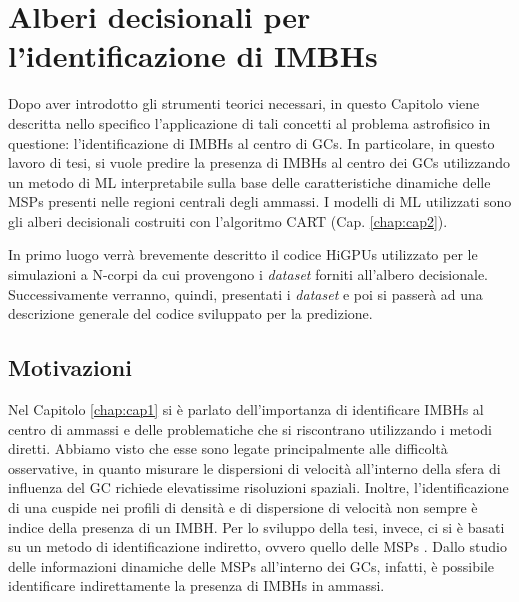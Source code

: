 \chapter{Alberi decisionali per l'identificazione di IMBHs}
\label{chap:cap3}
Dopo aver introdotto gli strumenti teorici necessari, in questo Capitolo viene descritta nello specifico l'applicazione di tali concetti al problema astrofisico in questione: l'identificazione di IMBHs al centro di GCs. In particolare, in questo lavoro di tesi, si vuole predire la presenza di IMBHs al centro dei GCs utilizzando un metodo di ML interpretabile sulla base delle caratteristiche dinamiche delle MSPs presenti nelle regioni centrali degli ammassi. I modelli di ML utilizzati sono gli alberi decisionali costruiti con l'algoritmo CART (Cap. \ref{chap:cap2}). 

In primo luogo verrà brevemente descritto il codice HiGPUs utilizzato per le simulazioni a N-corpi da cui provengono i \textit{dataset} forniti all'albero decisionale. Successivamente verranno, quindi, presentati i \textit{dataset} e poi si passerà ad una descrizione generale del codice sviluppato per la predizione.

\section{Motivazioni}
Nel Capitolo \ref{chap:cap1} si è parlato dell'importanza di identificare IMBHs al centro di ammassi e delle problematiche che si riscontrano utilizzando i metodi diretti. Abbiamo visto che esse sono legate principalmente alle difficoltà osservative, in quanto misurare le dispersioni di velocità all'interno della sfera di influenza del GC richiede elevatissime risoluzioni spaziali. Inoltre, l'identificazione di una cuspide nei profili di densità e di dispersione di velocità non sempre è indice della presenza di un IMBH.
Per lo sviluppo della tesi, invece, ci si è basati su un metodo di identificazione indiretto, ovvero quello delle MSPs \cite{abbate1:paper}. Dallo studio delle informazioni dinamiche delle MSPs all'interno dei GCs, infatti, è possibile identificare indirettamente la presenza di IMBHs in ammassi. 

